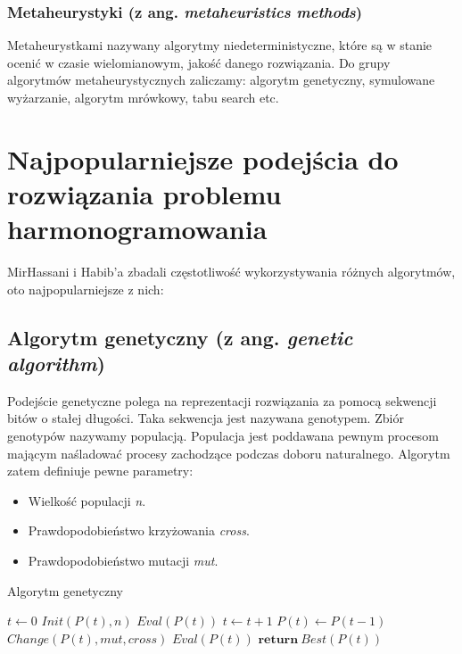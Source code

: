 \subsubsection{Metaheurystyki (z ang. \emph{metaheuristics methods})}
Metaheurystkami nazywany algorytmy niedeterministyczne, które są w stanie ocenić
w czasie wielomianowym, jakość danego rozwiązania. Do grupy algorytmów
metaheurystycznych zaliczamy: algorytm genetyczny, symulowane wyżarzanie,
algorytm mrówkowy, tabu search etc.
\section{Najpopularniejsze podejścia do rozwiązania problemu harmonogramowania}
MirHassani i Habib'a zbadali częstotliwość wykorzystywania różnych
algorytmów, oto najpopularniejsze z nich:
\subsection{Algorytm genetyczny (z ang. \emph{genetic algorithm})}
Podejście genetyczne \cite{komosinski2021} polega na reprezentacji rozwiązania za pomocą sekwencji
bitów o stałej długości. Taka sekwencja jest nazywana genotypem. Zbiór genotypów nazywamy
populacją. Populacja jest poddawana pewnym procesom mającym naśladować procesy
zachodzące podczas doboru naturalnego. Algorytm zatem definiuje pewne parametry:
\begin{itemize}
	\item Wielkość populacji \emph{n}.
	\item Prawdopodobieństwo krzyżowania \emph{cross}.
	\item Prawdopodobieństwo mutacji \emph{mut}.
\end{itemize}

\begin{algorithm}
\caption{Algorytm genetyczny}\label{alg-genetic}
\begin{algorithmic}[1]
\State $t\gets 0$
\State $Init(P(t),n)$
\State $Eval(P(t))$
\State $t\gets t+1$
\State $P(t)\gets P(t-1)$
\State $Change(P(t),mut,cross)$
\State $Eval(P(t))$
\EndWhile\label{euclidendwhile}
\State $\textbf{return}\ Best(P(t))$
\EndProcedure
\end{algorithmic}
\end{algorithm}

